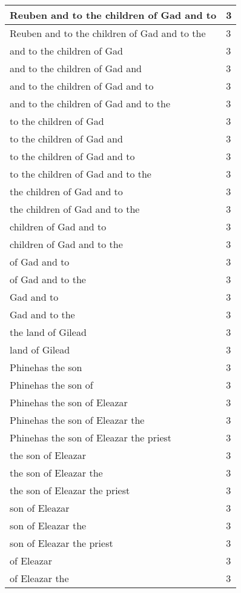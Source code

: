 \begin{center}
\begin{longtable}{|p{3.0in}|p{0.5in}|}
Reuben and to the children of Gad and to & 3\\ \hline 
Reuben and to the children of Gad and to the & 3\\ \hline 
and to the children of Gad & 3\\ \hline 
and to the children of Gad and & 3\\ \hline 
and to the children of Gad and to & 3\\ \hline 
and to the children of Gad and to the & 3\\ \hline 
to the children of Gad & 3\\ \hline 
to the children of Gad and & 3\\ \hline 
to the children of Gad and to & 3\\ \hline 
to the children of Gad and to the & 3\\ \hline 
the children of Gad and to & 3\\ \hline 
the children of Gad and to the & 3\\ \hline 
children of Gad and to & 3\\ \hline 
children of Gad and to the & 3\\ \hline 
of Gad and to & 3\\ \hline 
of Gad and to the & 3\\ \hline 
Gad and to & 3\\ \hline 
Gad and to the & 3\\ \hline 
the land of Gilead & 3\\ \hline 
land of Gilead & 3\\ \hline 
Phinehas the son & 3\\ \hline 
Phinehas the son of & 3\\ \hline 
Phinehas the son of Eleazar & 3\\ \hline 
Phinehas the son of Eleazar the & 3\\ \hline 
Phinehas the son of Eleazar the priest & 3\\ \hline 
the son of Eleazar & 3\\ \hline 
the son of Eleazar the & 3\\ \hline 
the son of Eleazar the priest & 3\\ \hline 
son of Eleazar & 3\\ \hline 
son of Eleazar the & 3\\ \hline 
son of Eleazar the priest & 3\\ \hline 
of Eleazar & 3\\ \hline 
of Eleazar the & 3\\ \hline 

\end{longtable}
\end{center}
